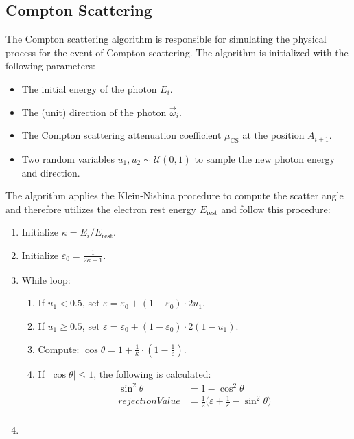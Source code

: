 \subsection{Compton Scattering}

The Compton scattering algorithm is responsible for simulating the physical process for the event of Compton scattering. The algorithm is initialized with the following parameters:
\begin{itemize}
    \item The initial energy of the photon $E_i$.
    \item The (unit) direction of the photon $\vec{\omega}_i$.
    \item The Compton scattering attenuation coefficient $\mu_{\text{CS}}$ at the position
    $A_{i+1}$.
    \item Two random variables $u_1, u_2 \sim \mathcal{U}(0, 1)$ to sample the
    new photon energy and direction.
\end{itemize}

The algorithm applies the Klein-Nishina procedure to compute the scatter angle
and therefore utilizes the electron rest energy $E_\text{rest}$ and follow this
procedure:

\begin{enumerate}[label=\Roman*.]
    \item Initialize $\kappa = E_i/ E_\text{rest}$.
    \item Initialize $\varepsilon_0 = \frac{1}{2\kappa + 1}$.
    \item While loop:
        \begin{enumerate}[label=\arabic*.]
            \item If $u_1 < 0.5$, set $\varepsilon = \varepsilon_0 +
            (1-\varepsilon_0) \cdot 2u_1$.
            \item If $u_1 \geq 0.5$, set $\varepsilon = \varepsilon_0 +
            (1-\varepsilon_0) \cdot 2(1-u_1)$.
            \item Compute: $\cos \theta = 1 + \frac{1}{\kappa} \cdot (1-\frac{1}{\varepsilon})$.
            \item If $\vert \cos \theta \vert \leq 1$, the following is calculated:
                \begin{align*}
                    \sin^2 \theta &= 1 - \cos^2 \theta \\
                    rejectionValue &= \frac{1}{2}\bigg(\varepsilon + \frac{1}{\varepsilon}- \sin^2 \theta\bigg)  \\
                \end{align*}
        \end{enumerate}
    \item 
\end{enumerate}

